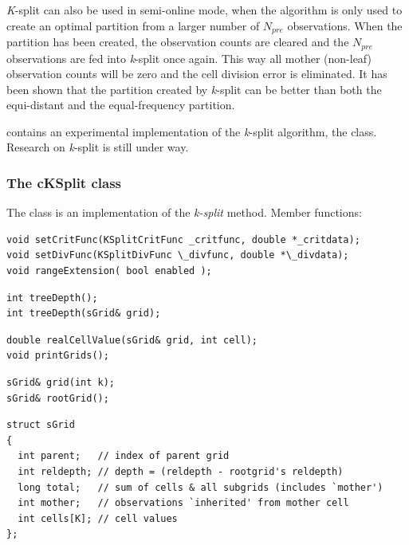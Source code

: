 \textit{K}-split can also be used in semi-online mode, when the
algorithm is only used to create an optimal partition from a larger
number of $N_{pre}$ observations. When the partition has been created,
the observation counts are cleared and the $N_{pre}$ observations are
fed into \textit{k}-split once again. This way all mother (non-leaf)
observation counts will be zero and the cell division error is
eliminated. It has been shown that the partition created by
\textit{k}-split can be better than both the equi-distant and the
equal-frequency partition.


{\opp} contains an experimental implementation of the \textit{k}-split
algorithm, the  class. Research on \textit{k}-split is
still under way.


\subsubsection{The cKSplit class}

The  class is an implementation of the \textit{k-split} method.
Member functions:

%
%

\begin{verbatim}
void setCritFunc(KSplitCritFunc _critfunc, double *_critdata);
void setDivFunc(KSplitDivFunc \_divfunc, double *\_divdata);
void rangeExtension( bool enabled );
\end{verbatim}


\begin{verbatim}
int treeDepth();
int treeDepth(sGrid& grid);
\end{verbatim}

\begin{verbatim}
double realCellValue(sGrid& grid, int cell);
void printGrids();
\end{verbatim}

\begin{verbatim}
sGrid& grid(int k);
sGrid& rootGrid();
\end{verbatim}

\begin{verbatim}
struct sGrid
{
  int parent;   // index of parent grid
  int reldepth; // depth = (reldepth - rootgrid's reldepth)
  long total;   // sum of cells & all subgrids (includes `mother')
  int mother;   // observations `inherited' from mother cell
  int cells[K]; // cell values
};
\end{verbatim}



